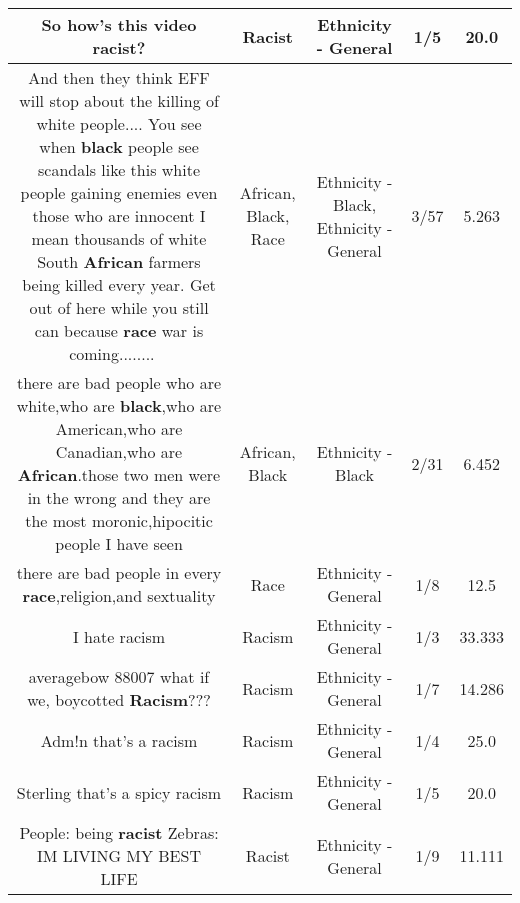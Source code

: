 \documentclass[11pt]{article}
\newlength\mylength
\begin{document}
\begin{center}
\begin{longtable}{|C{.65\mylength}|C{.30\mylength}|C{.12\mylength}|C{.12\mylength}|C{.12\mylength}|}
  \small So how's this video \textbf{racist}?\normalsize   & Racist & Ethnicity - General & 1/5 & 20.0 \\  \hline
  \small And then they think EFF will stop about the killing of white people.... You see when \textbf{black} people see scandals like this white people gaining enemies even those who are innocent I mean thousands of white South \textbf{African} farmers being killed every year. Get out of here while you still can because \textbf{race} war is coming........    🧗🏃\normalsize   & African, Black, Race & Ethnicity - Black, Ethnicity - General & 3/57 & 5.263 \\  \hline
  \small there are bad people who are white,who are \textbf{black},who are American,who are Canadian,who are \textbf{African}.those two men were in the wrong and they are the most moronic,hipocitic people I have seen\normalsize   & African, Black & Ethnicity - Black & 2/31 & 6.452 \\  \hline
  \small there are bad people in every \textbf{race},religion,and sextuality\normalsize   & Race & Ethnicity - General & 1/8 & 12.5 \\  \hline
  \small I hate racism\normalsize   & Racism & Ethnicity - General & 1/3 & 33.333 \\  \hline
  \small averagebow 88007 what if we, boycotted \textbf{Racism}???\normalsize   & Racism & Ethnicity - General & 1/7 & 14.286 \\  \hline
  \small Adm!n that's a racism\normalsize   & Racism & Ethnicity - General & 1/4 & 25.0 \\  \hline
  \small Sterling that's a spicy racism\normalsize   & Racism & Ethnicity - General & 1/5 & 20.0 \\  \hline
  \small People: being \textbf{racist} Zebras: IM LIVING MY BEST LIFE\normalsize   & Racist & Ethnicity - General & 1/9 & 11.111 \\  \hline

\end{longtable}
\end{center}
\end{document}
